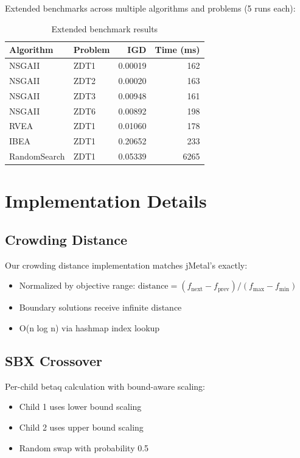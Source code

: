 \documentclass[10pt,a4paper]{article}
\begin{document}
Extended benchmarks across multiple algorithms and problems (5 runs each):

\begin{table}[h]
\centering
\caption{Extended benchmark results}
\label{tab:extended}
\begin{tabular}{@{}llrr@{}}
\toprule
\textbf{Algorithm} & \textbf{Problem} & \textbf{IGD} & \textbf{Time (ms)} \\
\midrule
NSGAII & ZDT1 & 0.00019 & 162 \\
NSGAII & ZDT2 & 0.00020 & 163 \\
NSGAII & ZDT3 & 0.00948 & 161 \\
NSGAII & ZDT6 & 0.00892 & 198 \\
RVEA & ZDT1 & 0.01060 & 178 \\
IBEA & ZDT1 & 0.20652 & 233 \\
RandomSearch & ZDT1 & 0.05339 & 6265 \\
\bottomrule
\end{tabular}
\end{table}

\section{Implementation Details}

\subsection{Crowding Distance}

Our crowding distance implementation matches jMetal's exactly:
\begin{itemize}
    \item Normalized by objective range: $\text{distance} = (f_{\text{next}} - f_{\text{prev}}) / (f_{\text{max}} - f_{\text{min}})$
    \item Boundary solutions receive infinite distance
    \item O(n log n) via hashmap index lookup
\end{itemize}

\subsection{SBX Crossover}

Per-child betaq calculation with bound-aware scaling:
\begin{itemize}
    \item Child 1 uses lower bound scaling
    \item Child 2 uses upper bound scaling
    \item Random swap with probability 0.5
\end{itemize}
\end{document}
